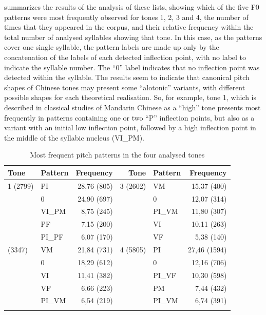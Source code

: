 \documentclass[output=paper]{langsci/langscibook}
\begin{document}
 summarizes the results of the analysis of these lists, showing which of the five F0 patterns were most frequently observed for tones 1, 2, 3 and 4, the number of times that they appeared in the corpus, and their relative frequency within the total number of analysed syllables showing that tone. In this case, as the patterns cover one single syllable, the pattern labels are made up only by the concatenation of the labels of each detected inflection point, with no label to indicate the syllable number. The ``0'' label indicates that no inflection point was detected within the syllable. The results seem to indicate that canonical pitch shapes of Chinese tones may present some ``alotonic'' variants, with different possible shapes for each theoretical realisation. So, for example, tone 1, which is described in classical studies of Mandarin Chinese as a ``high'' tone \citep{Chao1922} presents most frequently in patterns containing one or two ``P'' inflection points, but also as a variant with an initial low inflection point, followed by a high inflection point in the middle of the syllabic nucleus (VI\_PM). 

\begin{table}
\footnotesize
\begin{tabularx}{\textwidth}{X lrr lr}
\lsptoprule
Tone & Pattern & Frequency & Tone & Pattern & Frequency\\
\midrule 
1 (2799) & PI & 28,76 (805) & 3 (2602) & VM & 15,37 (400) \\
& 0 & 24,90 (697) &  & 0 & 12,07 (314) \\
& VI\_PM & 8,75 (245) &  & PI\_VM & 11,80 (307) \\
& PF & 7,15 (200) &  & VI & 10,11 (263) \\
& PI\_PF & 6,07 (170) &  & VF & 5,38 (140) \\
\tablevspace
2 (3347) & VM & 21,84 (731) & 4 (5805) & PI & 27,46 (1594) \\
& 0 & 18,29 (612) &  & 0 & 12,16 (706) \\
& VI & 11,41 (382) &  & PI\_VF & 10,30 (598) \\
& VF & 6,66 (223) &  & PM & 7,44 (432) \\
& PI\_VM & 6,54 (219) &  & PI\_VM & 6,74 (391) \\ 
\lspbottomrule
\end{tabularx}
\caption{Most frequent pitch patterns in the four analysed tones \citep{Yao2015}}
\label{tab:gar:10}
\end{table}
\end{document}
